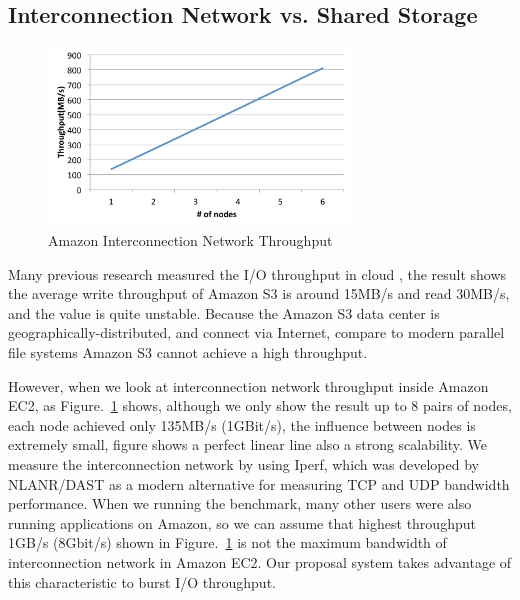 \subsection{Interconnection Network vs. Shared Storage}
\begin{figure}
\centering
\end{figure}
\begin{figure}
\centering
\includegraphics[width=8cm]{img/amazon_throughput}
\caption{Amazon Interconnection Network Throughput}
\label{background:amazon throughput}
\end{figure}
Many previous research measured the I/O throughput in cloud \cite{Chiba,Transactions_a_la_carte,
Interactive_Use_of_Cloud_Services,Amazon_S3_for_Science_Grids,anevaluation}, the result shows the
average write throughput of Amazon S3 is around 15MB/s and read 30MB/s, and the value is quite
unstable\cite{anevaluation}.
Because the Amazon S3 data center is geographically-distributed, and connect via Internet, compare
to modern parallel file systems Amazon S3 cannot achieve a high throughput.

However, when we look at interconnection network throughput inside Amazon EC2, as Figure.~\ref{background:amazon throughput} shows, although we only show the result up to 8 pairs of nodes, each
node achieved only 135MB/s (1GBit/s), the influence between nodes is extremely small, figure shows a perfect linear line also a strong scalability.
We measure the interconnection network by using Iperf\cite{iperf}, which was developed by NLANR/DAST
as a modern alternative for measuring TCP and UDP bandwidth performance.
When we running the
benchmark, many other users were also running applications on Amazon, so we can assume that highest
throughput 1GB/s (8Gbit/s) shown in Figure.~\ref{background:amazon throughput} is not the
maximum bandwidth of interconnection network in Amazon EC2.
Our proposal system takes advantage of this characteristic to burst I/O throughput.

